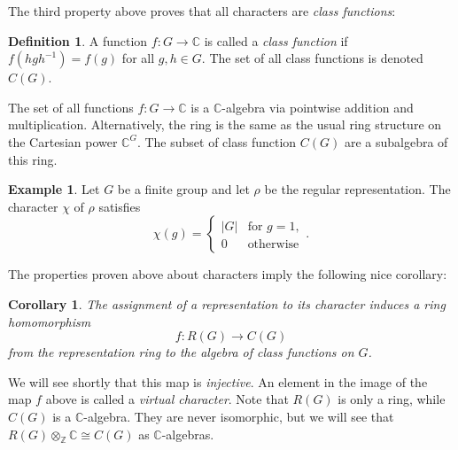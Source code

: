 \documentclass[12pt]{article}
\theoremstyle{plain}
\newtheorem{corollary}[theorem]{Corollary}
\theoremstyle{definition}
\newtheorem{definition}[theorem]{Definition}
\newtheorem{example}[theorem]{Example}
\theoremstyle{remark}
\numberwithin{equation}{section}
\begin{document}
The third property above proves that all characters are \emph{class
functions}:

\begin{definition}
A function $f : G \to \mathbb{C}$ is called a \emph{class function}
if $f(hgh^{-1})=f(g)$ for all $g,h \in G$.
The set of all class functions is denoted $C(G)$.
\end{definition}

The set of all functions $f : G \to \mathbb{C}$ is a
$\mathbb{C}$-algebra via pointwise addition and multiplication.
Alternatively, the ring is the same as the usual ring structure on the
Cartesian power $\mathbb{C}^G$.
The subset of class function $C(G)$ are a subalgebra of this ring.

\begin{example}
Let $G$ be a finite group and let $\rho$ be the regular representation.
The character $\chi$ of $\rho$ satisfies
\[
\chi(g) = \begin{cases}
|G| & \textrm{for $g=1$},\\
0 & \textrm{otherwise}
\end{cases} .
\]
\end{example}

The properties proven above about characters imply the following nice
corollary:

\begin{corollary}
The assignment of a representation to its character
induces a ring homomorphism
\[
f: R(G) \to C(G)
\]
from the representation ring to the algebra of class functions on $G$.
\end{corollary}

We will see shortly that this map is \emph{injective}.
An element in the image of the map $f$ above is called a \emph{virtual
character}.  Note that $R(G)$ is only a ring, while $C(G)$ is a
$\mathbb{C}$-algebra.  They are never isomorphic, but we will see that
$R(G) \otimes_\mathbb{Z} \mathbb{C} \cong C(G)$ as $\mathbb{C}$-algebras.




\end{document}
